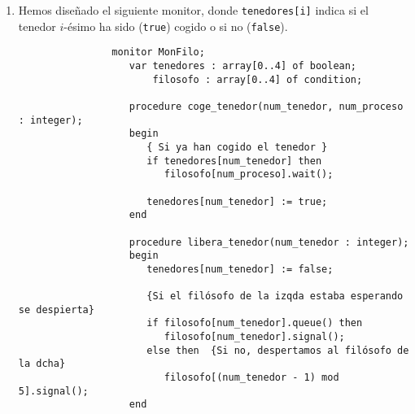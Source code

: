 \begin{ejercicio}
    \begin{enumerate}
        \item Hemos diseñado el siguiente monitor, donde \verb|tenedores[i]| indica si el tenedor $i$-ésimo ha sido (\verb|true|) cogido o si no (\verb|false|).
            \begin{verbatim}
                monitor MonFilo;
                   var tenedores : array[0..4] of boolean;
                       filosofo : array[0..4] of condition;

                   procedure coge_tenedor(num_tenedor, num_proceso : integer);
                   begin
                      { Si ya han cogido el tenedor }
                      if tenedores[num_tenedor] then
                         filosofo[num_proceso].wait();

                      tenedores[num_tenedor] := true;
                   end

                   procedure libera_tenedor(num_tenedor : integer);
                   begin
                      tenedores[num_tenedor] := false;

                      {Si el filósofo de la izqda estaba esperando se despierta}
                      if filosofo[num_tenedor].queue() then
                         filosofo[num_tenedor].signal();
                      else then  {Si no, despertamos al filósofo de la dcha}
                         filosofo[(num_tenedor - 1) mod 5].signal();
                   end


\end{verbatim}
\end{enumerate}
\end{ejercicio}
